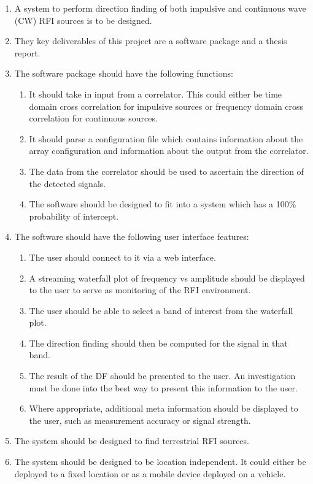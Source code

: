 \begin{enumerate}
  \item A system to perform direction finding of both impulsive and continuous wave (CW) RFI sources is to be designed.
  \item They key deliverables of this project are a software package and a thesis report.
  \item The software package should have the following functions:
    \begin{enumerate}
      \item It should take in input from a correlator. This could either be time domain cross correlation for impulsive sources or frequency domain cross correlation for continuous sources. 
      \item It should parse a configuration file which contains information about the array configuration and information about the output from the correlator.
      \item The data from the correlator should be used to ascertain the direction of the detected signals.
      \item The software should be designed to fit into a system which has a 100\% probability of intercept. 
    \end{enumerate}
  \item The software should have the following user interface features:
    \begin{enumerate}
      \item The user should connect to it via a web interface.
      \item A streaming waterfall plot of frequency vs amplitude should be displayed to the user to serve as monitoring of the RFI environment.
      \item The user should be able to select a band of interest from the waterfall plot.
      \item The direction finding should then be computed for the signal in that band.
      \item The result of the DF should be presented to the user. An investigation must be done into the best way to present this information to the user.
      \item Where appropriate, additional meta information should be displayed to the user, such as measurement accuracy or signal strength.
    \end{enumerate}
  \item The system should be designed to find terrestrial RFI sources.
  \item The system should be designed to be location independent. It could either be deployed to a fixed location or as a mobile device deployed on a vehicle.

\end{enumerate}
